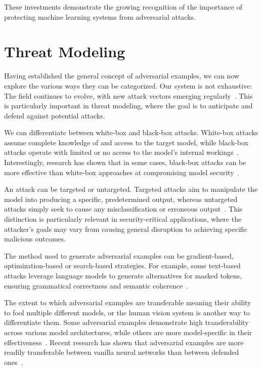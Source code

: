 \documentclass[a4paper, oneside]{discothesis}
\begin{document}
These investments demonstrate the growing recognition of the importance of protecting machine learning systems from adversarial attacks.

\section{Threat Modeling}

Having established the general concept of adversarial examples, we can now explore the various ways they can be categorized. Our system is not exhaustive: The field continues to evolve, with new attack vectors emerging regularly~\cite{Khaleel2024AdversarialAI}. This is particularly important in threat modeling, where the goal is to anticipate and defend against potential attacks.

We can differentiate between white-box and black-box attacks. White-box attacks assume complete knowledge of and access to the target model, while black-box attacks operate with limited or no access to the model's internal workings~\cite{capozzi2024adversarial}. Interestingly, research has shown that in some cases, black-box attacks can be more effective than white-box approaches at compromising model security~\cite{capozzi2024adversarial}.

An attack can be targeted or untargeted. Targeted attacks aim to manipulate the model into producing a specific, predetermined output, whereas untargeted attacks simply seek to cause any misclassification or erroneous output~\cite{capozzi2024adversarial, Kashyap2024AdversarialAA}. This distinction is particularly relevant in security-critical applications, where the attacker's goals may vary from causing general disruption to achieving specific malicious outcomes.

The method used to generate adversarial examples can be gradient-based, optimization-based or search-based strategies. For example, some text-based attacks leverage language models to generate alternatives for masked tokens, ensuring grammatical correctness and semantic coherence~\cite{garg2020bae}.

The extent to which adversarial examples are transferable \textendash{} meaning their ability to fool multiple different models, or the human vision system\cite{elsayed2018adversarial} \textendash{} is another way to differentiate them. Some adversarial examples demonstrate high transferability across various model architectures, while others are more model-specific in their effectiveness~\cite{Li2022ASO, li2022review}. Recent research has shown that adversarial examples are more readily transferable between vanilla neural networks than between defended ones~\cite{li2019nattack, zheng2023black}.
\end{document}
